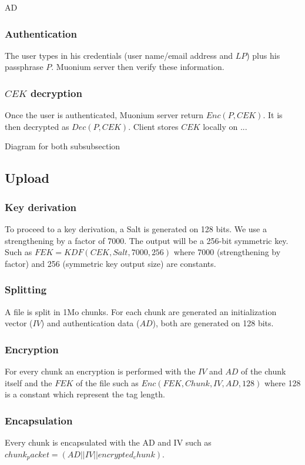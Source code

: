 AD\documentclass[a4paper,10pt]{article}
\begin{document}
\subsubsection{Authentication}
The user types in his credentials (user name/email address and $LP$) plus his passphrase $P$. Muonium server then verify these information.

\subsubsection{$CEK$ decryption}
Once the user is authenticated, Muonium server return $Enc(P, CEK)$. It is then decrypted as $Dec(P, CEK)$. Client stores $CEK$ locally on ...

Diagram for both subsubsection

\subsection{Upload}
\subsubsection{Key derivation}
To proceed to a key derivation, a Salt is generated on 128 bits. We use a strengthening by a factor of 7000. The output will be a 256-bit symmetric key. Such as $FEK = KDF(CEK, Salt, 7000, 256)$ where 7000 (strengthening by factor) and 256 (symmetric key output size) are constants.

\subsubsection{Splitting}
A file is split in 1Mo chunks. For each chunk are generated an initialization vector ($IV$) and authentication data  ($AD$), both are generated on 128 bits.

\subsubsection{Encryption}
For every chunk an encryption is performed with the $IV$ and $AD$ of the chunk itself and the $FEK$ of the file such as $Enc(FEK, Chunk, IV, AD, 128)$ where 128 is a constant which represent the tag length.

\subsubsection{Encapsulation}
Every chunk is encapsulated with the AD and IV such as $chunk_packet=(AD||IV||encrypted_chunk)$.
\end{document}
